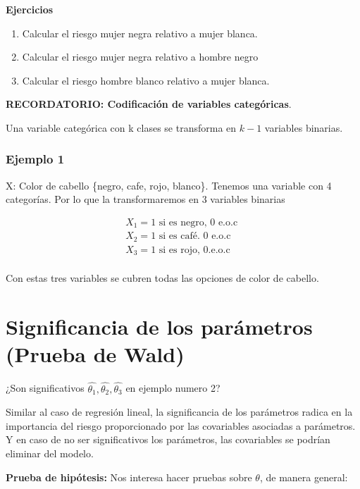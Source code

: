 \documentclass[
  a4paper,
  oneside,
  openany]{book}
\begin{document}
\textbf{Ejercicios}

\begin{enumerate}
\def\labelenumi{\arabic{enumi})}
\item
  Calcular el riesgo mujer negra relativo a mujer blanca.
\item
  Calcular el riesgo mujer negra relativo a hombre negro
\item
  Calcular el riesgo hombre blanco relativo a mujer blanca.
\end{enumerate}

\textbf{RECORDATORIO: Codificación de variables categóricas}.

Una variable categórica con k clases se transforma en \(k-1\) variables binarias.

\hypertarget{ejemplo-1-3}{%
\subsubsection*{Ejemplo 1}\label{ejemplo-1-3}}


X: Color de cabello \{negro, cafe, rojo, blanco\}. Tenemos una variable con 4 categorías. Por lo que la transformaremos en 3 variables binarias

\[
\begin{array}{l}
X_1 = \mbox{1 si es negro, 0 e.o.c } \\
X_2 = \mbox{1 si es café. 0 e.o.c } \\
X_3 = \mbox{1 si es rojo, 0.e.o.c} \\
\end{array}
\]

Con estas tres variables se cubren todas las opciones de color de cabello.

\hypertarget{significancia-de-los-paruxe1metros-prueba-de-wald}{%
\section{Significancia de los parámetros (Prueba de Wald)}\label{significancia-de-los-paruxe1metros-prueba-de-wald}}

¿Son significativos \(\hat{\theta_1}, \hat{\theta_2}, \hat{\theta_3}\) en ejemplo numero 2?

Similar al caso de regresión lineal, la significancia de los parámetros radica en la importancia del riesgo proporcionado por las covariables asociadas a parámetros. Y en caso de no ser significativos los parámetros, las covariables se podrían eliminar del modelo.

\textbf{Prueba de hipótesis:} Nos interesa hacer pruebas sobre \(\theta\), de manera general:
\end{document}
